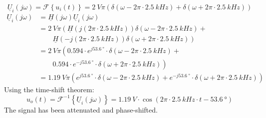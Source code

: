 \begin{solution}
\begin{tasks}
		\task
		\begin{equation*}
			\underline{U}_i\left(j \omega\right) = \mathcal{F}\left\{u_i(t)\right\} = \SI{2}{V} \pi \left(\delta\left(\omega - 2 \pi \cdot \SI{2.5}{kHz}\right) + \delta\left(\omega + 2 \pi \cdot \SI{2.5}{kHz}\right)\right)
		\end{equation*}
		\begin{equation*}
			\begin{split}
				\underline{U}_i\left(j \omega\right) &= \underline{H}\left(j \omega\right) \underline{U}_i\left(j \omega\right) \\
				 &= \SI{2}{V} \pi \left(\underline{H}\left(j \left(2 \pi \cdot \SI{2.5}{kHz}\right)\right) \delta\left(\omega - 2 \pi \cdot \SI{2.5}{kHz}\right) \right. + \\ &\qquad \left. \underline{H}\left(-j \left(2 \pi \cdot \SI{2.5}{kHz}\right)\right) \delta\left(\omega + 2 \pi \cdot \SI{2.5}{kHz}\right)\right) \\
				 &= \SI{2}{V} \pi \left(0.594 \cdot e^{j \SI{53.6}{\degree}} \cdot \delta\left(\omega - 2 \pi \cdot \SI{2.5}{kHz}\right) \right. + \\ &\qquad \left. 0.594 \cdot e^{-j \SI{53.6}{\degree}} \cdot \delta\left(\omega + 2 \pi \cdot \SI{2.5}{kHz}\right)\right) \\
				 &= \SI{1.19}{V} \pi \left(e^{j \SI{53.6}{\degree}} \cdot \delta\left(\omega - 2 \pi \cdot \SI{2.5}{kHz}\right) + e^{-j \SI{53.6}{\degree}} \cdot \delta\left(\omega + 2 \pi \cdot \SI{2.5}{kHz}\right)\right)
			\end{split}
		\end{equation*}
		Using the time-shift theorem:
		\begin{equation*}
			u_o(t) = \mathcal{F}^{-1}\left\{\underline{U}_i\left(j \omega\right)\right\} = \SI{1.19}{V} \cdot \cos\left(2 \pi \cdot \SI{2.5}{kHz} \cdot t - \SI{53.6}{\degree}\right)
		\end{equation*}
		The signal has been attenuated and phase-shifted.
	\end{tasks}
\end{solution}

